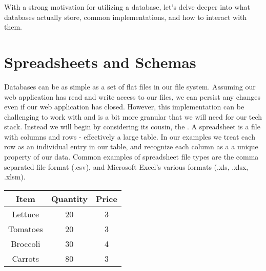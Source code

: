 With a strong motivation for utilizing a database, let's delve deeper into what databases actually store, common implementations, and how to interact with them. 


\section{Spreadsheets and Schemas}

Databases can be as simple as a set of flat files in our file system. Assuming our web application has read and write access to our files, we can persist any changes even if our web application has closed. However, this implementation can be challenging to work with and is a bit more granular that we will need for our tech stack. Instead we will begin by considering its cousin, the . A spreadsheet is a file with columns and rows - effectively a large table. In our examples we treat each row as an individual entry in our table, and recognize each column as a a unique property of our data. Common examples of spreadsheet file types are the comma separated file format (.csv), and Microsoft Excel's various formats (.xls, .xlsx, .xlsm).


\begin{center}
    \begin{tabular}{ |c|c|c| } 
        \hline
        \textbf{Item} & \textbf{Quantity} & \textbf{Price} \\ 
        \hline
        Lettuce & 20 & 3 \\ 
        \hline
        Tomatoes & 20 & 3 \\ 
        \hline
        Broccoli & 30 & 4 \\ 
        \hline
        Carrots & 80 & 3 \\ 
        \hline
    \end{tabular}
\end{center}

